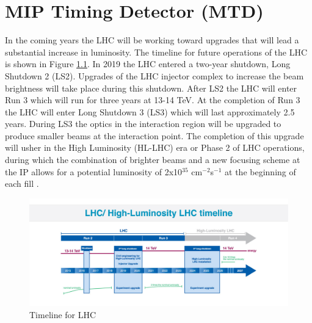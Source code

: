 \chapter{MIP Timing Detector (MTD)}

In the coming years the LHC will be working toward upgrades that will lead a substantial increase in luminosity.  The timeline for future operations of the LHC is shown in Figure \ref{fig:lhctimeline}.  In 2019 the LHC entered a two-year shutdown, Long Shutdown 2 (LS2).  Upgrades of the LHC injector complex to increase the beam brightness will take place during this shutdown.  After LS2 the LHC will enter Run 3 which will run for three years at 13-14 TeV.  At the completion of Run 3 the LHC will enter Long Shutdown 3 (LS3) which will last approximately 2.5 years.  During LS3 the optics in the interaction region will be upgraded to produce smaller beams at the interaction point.  The completion of this upgrade will usher in the High Luminosity (HL-LHC) era or Phase 2 of LHC operations, during which the combination of brighter beams and a new focusing scheme at the IP allows for a potential luminosity of 2x10$^{35}$ cm$^{-2}$s$^{-1}$ at the beginning of each fill \cite{Apollinari:2017cqg}.  

\begin{figure}[h]
	\centering
	\includegraphics[width=1.0\linewidth]{Figures/LHCTimeline}
	\caption[Timeline for LHC]{Timeline for LHC \cite{DeMelis:2063307}}
	\label{fig:lhctimeline}
\end{figure}


